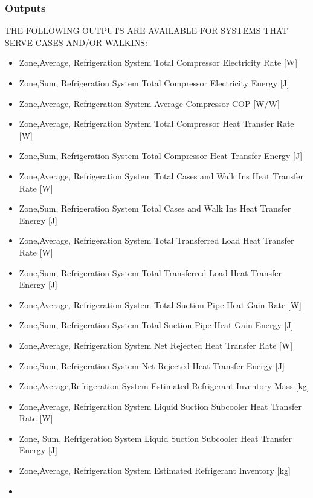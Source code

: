 \subsubsection{Outputs}\label{outputs-2-018}

THE FOLLOWING OUTPUTS ARE AVAILABLE FOR SYSTEMS THAT SERVE CASES AND/OR WALKINS:

\begin{itemize}
\item
  Zone,Average, Refrigeration System Total Compressor Electricity Rate {[}W{]}
\item
  Zone,Sum, Refrigeration System Total Compressor Electricity Energy {[}J{]}
\item
  Zone,Average, Refrigeration System Average Compressor COP {[}W/W{]}
\item
  Zone,Average, Refrigeration System Total Compressor Heat Transfer Rate {[}W{]}
\item
  Zone,Sum, Refrigeration System Total Compressor Heat Transfer Energy {[}J{]}
\item
  Zone,Average, Refrigeration System Total Cases and Walk Ins Heat Transfer Rate {[}W{]}
\item
  Zone,Sum, Refrigeration System Total Cases and Walk Ins Heat Transfer Energy {[}J{]}
\item
  Zone,Average, Refrigeration System Total Transferred Load Heat Transfer Rate {[}W{]}
\item
  Zone,Sum, Refrigeration System Total Transferred Load Heat Transfer Energy {[}J{]}
\item
  Zone,Average, Refrigeration System Total Suction Pipe Heat Gain Rate {[}W{]}
\item
  Zone,Sum, Refrigeration System Total Suction Pipe Heat Gain Energy {[}J{]}
\item
  Zone,Average, Refrigeration System Net Rejected Heat Transfer Rate {[}W{]}
\item
  Zone,Sum, Refrigeration System Net Rejected Heat Transfer Energy {[}J{]}
\item
  Zone,Average,Refrigeration System Estimated Refrigerant Inventory Mass {[}kg{]}
\item
  Zone,Average, Refrigeration System Liquid Suction Subcooler Heat Transfer Rate {[}W{]}
\item
  Zone, Sum, Refrigeration System Liquid Suction Subcooler Heat Transfer Energy {[}J{]}
\item
  Zone,Average, Refrigeration System Estimated Refrigerant Inventory {[}kg{]}
\item

\end{itemize}
